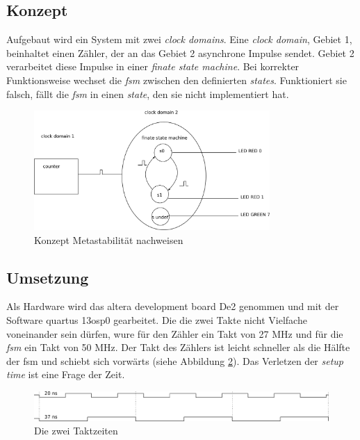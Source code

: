 \subsection{Konzept}\label{sect.metastabil_ansatz}

Aufgebaut wird ein System mit zwei \textit{clock domains}. Eine \textit{clock domain}, Gebiet 1,  beinhaltet einen Zähler, der an das Gebiet 2 asynchrone Impulse sendet. Gebiet 2 verarbeitet diese Impulse in einer \textit{finate state machine}. Bei korrekter Funktionsweise wechset die \textit{fsm} zwischen den definierten \textit{states}. Funktioniert sie falsch, fällt die \textit{fsm} in einen \textit{state}, den sie nicht implementiert hat.

\begin{figure}[H]
	\includegraphics[width=0.8\textwidth]{images/metastability/konzept.png}
	\caption{Konzept Metastabilität nachweisen}
	\label{fig.metastabil.fsm}
\end{figure}

\subsection{Umsetzung}\label{sect.metastabil_implementation}

Als Hardware wird das altera development board De2 genommen und mit der Software quartus 13osp0 gearbeitet. Die die zwei Takte nicht Vielfache voneinander sein dürfen, wure für den Zähler ein Takt von 27 MHz und für die \textit{fsm} ein Takt von 50 MHz. Der Takt des Zählers ist leicht schneller als die Hälfte der fsm und schiebt sich  vorwärts (siehe Abbildung \ref{fig.metastabil.takte}). Das Verletzen der \textit{setup time} ist eine Frage der Zeit.

\begin{figure}[H]
	\includegraphics[width=1\textwidth]{images/metastability/2_takte.png}
	\caption{Die zwei Taktzeiten}
	\label{fig.metastabil.takte}
\end{figure}

